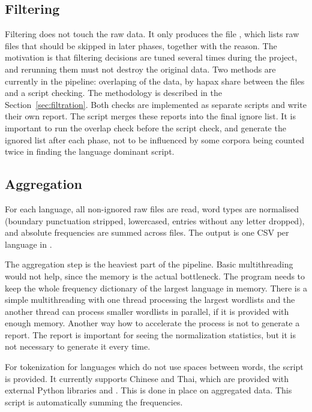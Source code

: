 \subsection{Filtering}

Filtering does not touch the raw data. It only produces the file , which lists raw files that should be skipped in later phases, together with the reason. The motivation is that filtering decisions are tuned several times during the project, and rerunning them must not destroy the original data. Two methods are currently in the pipeline: overlaping of the data, by hapax share between the files and a script checking. The methodology is described in the Section~\ref{sec:filtration}. Both checks are implemented as separate scripts and write their own report. The script  merges these reports into the final ignore list. It is important to run the overlap check before the script check, and generate the ignored list after each phase, not to be influenced by some corpora being counted twice in finding the language dominant script.

\subsection{Aggregation}

 For each language, all non-ignored raw files are read, word types are normalised (boundary punctuation stripped, lowercased, entries without any letter dropped), and absolute frequencies are summed across files. The output is one CSV per language in .

The aggregation step is the heaviest part of the pipeline. Basic multithreading would not help, since the memory is the actual bottleneck. The program needs to keep the whole frequency dictionary of the largest language in memory. There is a simple multithreading with one thread processing the largest wordlists and the another thread can process smaller wordlists in parallel, if it is provided with enough memory. Another way how to accelerate the process is not to generate a report. The report is important for seeing the normalization statistics, but it is not necessary to generate it every time.

For tokenization for languages which do not use spaces between words, the script  is provided. It currently supports Chinese and Thai, which are provided with external Python libraries  and . This is done in place on aggregated data. This script is automatically summing the frequencies.


